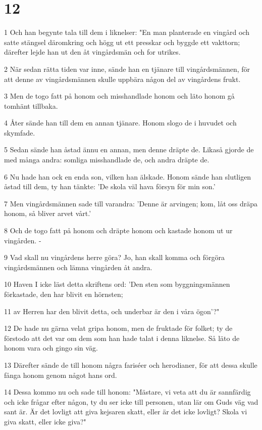 \chapter{12}

\par 1 Och han begynte tala till dem i liknelser: "En man planterade en vingård och satte stängsel däromkring och högg ut ett presskar och byggde ett vakttorn; därefter lejde han ut den åt vingårdsmän och for utrikes.
\par 2 När sedan rätta tiden var inne, sände han en tjänare till vingårdsmännen, för att denne av vingårdsmännen skulle uppbära någon del av vingårdens frukt.
\par 3 Men de togo fatt på honom och misshandlade honom och läto honom gå tomhänt tillbaka.
\par 4 Åter sände han till dem en annan tjänare. Honom slogo de i huvudet och skymfade.
\par 5 Sedan sände han åstad ännu en annan, men denne dräpte de. Likaså gjorde de med många andra: somliga misshandlade de, och andra dräpte de.
\par 6 Nu hade han ock en enda son, vilken han älskade. Honom sände han slutligen åstad till dem, ty han tänkte: 'De skola väl hava försyn för min son.'
\par 7 Men vingårdsmännen sade till varandra: 'Denne är arvingen; kom, låt oss dräpa honom, så bliver arvet vårt.'
\par 8 Och de togo fatt på honom och dräpte honom och kastade honom ut ur vingården. -
\par 9 Vad skall nu vingårdens herre göra? Jo, han skall komma och förgöra vingårdsmännen och lämna vingården åt andra.
\par 10 Haven I icke läst detta skriftens ord: 'Den sten som byggningsmännen förkastade, den har blivit en hörnsten;
\par 11 av Herren har den blivit detta, och underbar är den i våra ögon'?"
\par 12 De hade nu gärna velat gripa honom, men de fruktade för folket; ty de förstodo att det var om dem som han hade talat i denna liknelse. Så läto de honom vara och gingo sin väg.
\par 13 Därefter sände de till honom några fariséer och herodianer, för att dessa skulle fånga honom genom något hans ord.
\par 14 Dessa kommo nu och sade till honom: "Mästare, vi veta att du är sannfärdig och icke frågar efter någon, ty du ser icke till personen, utan lär om Guds väg vad sant är. Är det lovligt att giva kejsaren skatt, eller är det icke lovligt? Skola vi giva skatt, eller icke giva?"
